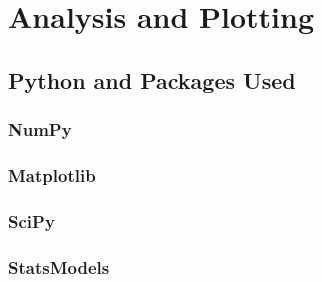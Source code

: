
%
%

\section{Analysis and Plotting}
\label{sec:analysis}





\subsection{Python and Packages Used}
\label{subsec:python}



\subsubsection{NumPy}
\label{subsubsec:numpy}



\subsubsection{Matplotlib}
\label{subsubsec:matplotlib}



\subsubsection{SciPy}
\label{subsubsec:scipy}



\subsubsection{StatsModels}
\label{subsubsec:statsmodels}




